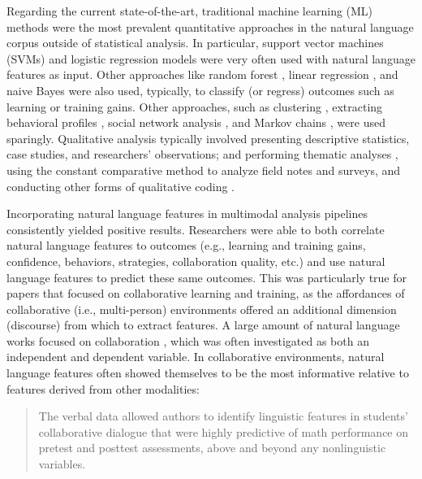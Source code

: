 \documentclass[manuscript,screen,review]{acmart}
\begin{document}
Regarding the current state-of-the-art, traditional machine learning (ML) methods were the most prevalent quantitative approaches in the natural language corpus outside of statistical analysis. In particular, support vector machines (SVMs) \cite{3754172825,85990093,1637690235} and logistic regression models \cite{957160695,3796180663,1576545447} were very often used with natural language features as input. Other approaches like random forest \cite{2273914836}, linear regression \cite{1118315889}, and naive Bayes \cite{1637690235} were also used, typically, to classify (or regress) outcomes such as learning or training gains. Other approaches, such as clustering \cite{2273914836}, extracting behavioral profiles \cite{2273914836}, social network analysis \cite{2345021698}, and Markov chains \cite{3135645357}, were used sparingly. Qualitative analysis typically involved presenting descriptive statistics, case studies, and researchers' observations; and performing thematic analyses \cite{braun2012thematic}, using the constant comparative method \cite{glaser1965constant} to analyze field notes and surveys, and conducting other forms of qualitative coding \cite{2497456347,1847468084,1296637108}.

Incorporating natural language features in multimodal analysis pipelines consistently yielded positive results. Researchers were able to both correlate natural language features to outcomes (e.g., learning and training gains, confidence, behaviors, strategies, collaboration quality, etc.) and use natural language features to predict these same outcomes. This was particularly true for papers that focused on collaborative learning and training, as the affordances of collaborative (i.e., multi-person) environments offered an additional dimension (discourse) from which to extract features. A large amount of natural language works focused on collaboration \cite{1118315889,3095923626,1637690235}, which was often investigated as both an independent and dependent variable. In collaborative environments, natural language features often showed themselves to be the most informative relative to features derived from other modalities:

\begin{quote}
    The verbal data allowed authors to identify linguistic features in students' collaborative dialogue that were highly predictive of math performance on pretest and posttest assessments, above and beyond any nonlinguistic variables. \cite{3796180663}
\end{quote}
\end{document}
